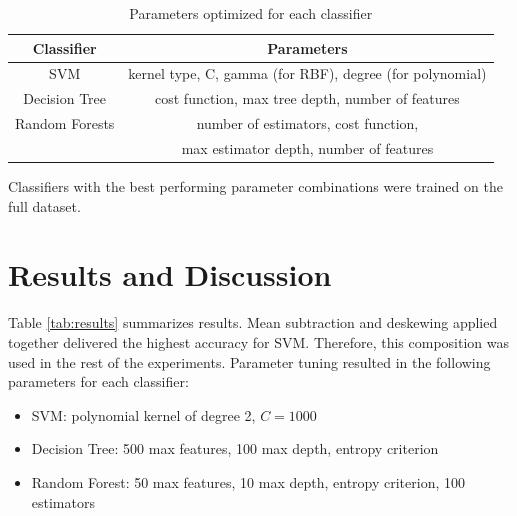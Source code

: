 \documentclass[journal, a4paper]{IEEEtran}
\begin{document}
		\begin{table}[!hbt]
		\begin{center}
		\caption{Parameters optimized for each classifier}
		\label{tab:parameters}
		\begin{tabular}{c|c}
			Classifier & Parameters \\
			\hline
			SVM & kernel type, C, gamma (for RBF), degree (for polynomial) \\
			\hline
			Decision Tree & cost function, max tree depth, number of features \\
			\hline
			Random Forests & number of estimators, cost function, \\ 
			& max estimator depth, number of features\\
		\end{tabular}
		\end{center}
	\end{table}
	
	Classifiers with the best performing parameter combinations were trained on the full dataset.
		
		
\section {Results and Discussion}
    Table \ref{tab:results} summarizes results. Mean subtraction and deskewing applied together delivered the highest accuracy for SVM. Therefore, this composition was used in the rest of the experiments. Parameter tuning resulted in the following parameters for each classifier:
    \begin{itemize}
     \item SVM: \hfill polynomial kernel of degree 2, $C = 1000$
     \item Decision Tree: 500 max features, 100 max depth, entropy criterion
     \item Random Forest: 50 max features, 10 max depth, entropy criterion, 100 estimators
    \end{itemize}
\end{document}
